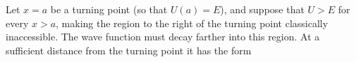 Let $x=a$ be a turning point (so that $U(a)=E$), and suppose that $U>E$ for every $x>a$, making the region to the right of the turning point classically inaccessible. The wave function must decay farther into this region. At a sufficient distance from the turning point it has the form
